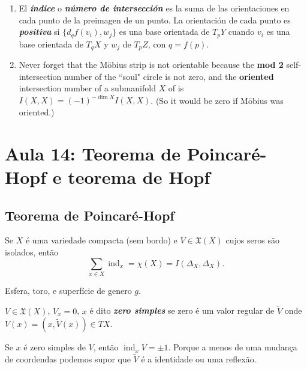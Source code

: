 \begin{enumerate}
\item El \textit{\textbf{índice}} o \textit{\textbf{número de intersección}} es la suma de las orientaciones en cada punto de la preimagen de un punto. La orientación de cada punto es \textit{\textbf{positiva}} si \(\{d_{q}f(v_i),w_j\}\) es una base orientada de \(T_pY\) cuando \(v_i\) es una base orientada de \(T_qX\) y \(w_j\) de \(T_pZ\), con  \(q=f(p)\).

\item Never forget that the Möbius strip is not orientable because the \textbf{mod 2} self-intersection number of the ``soul" circle is not zero, and the \textbf{oriented} intersection number of a submanifold \(X\) of is \(I(X,X)=(-1)^{-\dim X}I(X,X)\). (So it would be zero if Möbius was oriented.)
\end{enumerate}
\section{Aula 14: Teorema de Poincaré-Hopf e teorema de Hopf}

\subsection{Teorema de Poincaré-Hopf}

\begin{thm}\leavevmode
Se \(X\) é uma variedade compacta (sem bordo) e \(V \in \mathfrak{X}(X)\) cujos seros são isolados, então
\[\sum_{x \in X} \operatorname{ind}_x=\chi(X)=I(\Delta_X,\Delta_X).\]
\end{thm}

\begin{example}\leavevmode
Esfera, toro, e superfície de genero \(g\).
\end{example}

\begin{remark}\leavevmode
\(V \in \mathfrak{X}(X)\), \(V_x=0\), \(x\) é dito \textit{\textbf{zero simples}} se zero é um valor regular de \(\tilde{V}\) onde \(V(x)=(x,\tilde{V}(x)) \in TX\). 
\end{remark}

\begin{remark}\leavevmode
Se \(x\) é zero simples de \(V\), então \(\operatorname{ind}_x V=\pm 1\). 
Porque a menos de uma mudança de coordendas podemos supor que \(\tilde{V}\) é a identidade ou uma reflexão.
\end{remark}

